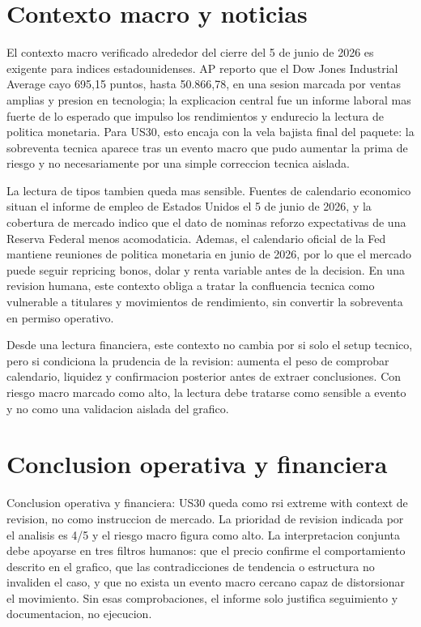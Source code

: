 \documentclass[11pt,a4paper]{article}
\begin{document}
\section*{Contexto macro y noticias}
El contexto macro verificado alrededor del cierre del 5 de junio de 2026 es exigente para indices estadounidenses. AP reporto que el Dow Jones Industrial Average cayo 695,15 puntos, hasta 50.866,78, en una sesion marcada por ventas amplias y presion en tecnologia; la explicacion central fue un informe laboral mas fuerte de lo esperado que impulso los rendimientos y endurecio la lectura de politica monetaria. Para US30, esto encaja con la vela bajista final del paquete: la sobreventa tecnica aparece tras un evento macro que pudo aumentar la prima de riesgo y no necesariamente por una simple correccion tecnica aislada.

La lectura de tipos tambien queda mas sensible. Fuentes de calendario economico situan el informe de empleo de Estados Unidos el 5 de junio de 2026, y la cobertura de mercado indico que el dato de nominas reforzo expectativas de una Reserva Federal menos acomodaticia. Ademas, el calendario oficial de la Fed mantiene reuniones de politica monetaria en junio de 2026, por lo que el mercado puede seguir repricing bonos, dolar y renta variable antes de la decision. En una revision humana, este contexto obliga a tratar la confluencia tecnica como vulnerable a titulares y movimientos de rendimiento, sin convertir la sobreventa en permiso operativo.

Desde una lectura financiera, este contexto no cambia por si solo el setup tecnico, pero si condiciona la prudencia de la revision: aumenta el peso de comprobar calendario, liquidez y confirmacion posterior antes de extraer conclusiones. Con riesgo macro marcado como alto, la lectura debe tratarse como sensible a evento y no como una validacion aislada del grafico.

\section*{Conclusion operativa y financiera}
Conclusion operativa y financiera: US30 queda como rsi extreme with context de revision, no como instruccion de mercado. La prioridad de revision indicada por el analisis es 4/5 y el riesgo macro figura como alto. La interpretacion conjunta debe apoyarse en tres filtros humanos: que el precio confirme el comportamiento descrito en el grafico, que las contradicciones de tendencia o estructura no invaliden el caso, y que no exista un evento macro cercano capaz de distorsionar el movimiento. Sin esas comprobaciones, el informe solo justifica seguimiento y documentacion, no ejecucion.
\end{document}
